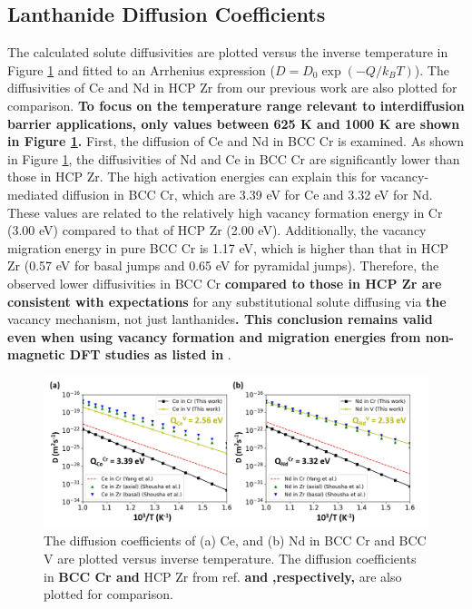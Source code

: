\documentclass[preprint,12pt]{elsarticle}
\providecommand{\DIFaddtex}[1]{{\bf #1}} %
\providecommand{\DIFdeltex}[1]{} %
\providecommand{\DIFaddbegin}{\protect\color{blue}} %
\providecommand{\DIFaddend}{\protect\color{black}} %
\providecommand{\DIFdelbegin}{\protect\color{red}} %
\providecommand{\DIFdelend}{\protect\color{black}} %
\providecommand{\DIFaddFL}[1]{\DIFadd{#1}} %
\providecommand{\DIFaddbeginFL}{} %
\providecommand{\DIFaddendFL}{} %
\providecommand{\DIFdelbeginFL}{} %
\providecommand{\DIFdelendFL}{} %
\providecommand{\DIFadd}[1]{\texorpdfstring{\DIFaddtex{#1}}{#1}} %
\providecommand{\DIFdel}[1]{\texorpdfstring{\DIFdeltex{#1}}{}} %
\newcommand{\DIFscaledelfig}{0.5}
\newlength{\DIFdelgraphicswidth} %
\newlength{\DIFdelgraphicsheight} %
\newcommand{\DIFaddincludegraphics}[2][]{{\color{blue}\fbox{\DIFOincludegraphics[#1]{#2}}}} %
\newcommand{\DIFdelincludegraphics}[2][]{%
\sbox{\DIFdelgraphicsbox}{\DIFOincludegraphics[#1]{#2}}%
\settoboxwidth{\DIFdelgraphicswidth}{\DIFdelgraphicsbox} %
\settoboxtotalheight{\DIFdelgraphicsheight}{\DIFdelgraphicsbox} %
\scalebox{\DIFscaledelfig}{%
\parbox[b]{\DIFdelgraphicswidth}{\usebox{\DIFdelgraphicsbox}\\[-\baselineskip] \rule{\DIFdelgraphicswidth}{0em}}\llap{\resizebox{\DIFdelgraphicswidth}{\DIFdelgraphicsheight}{%
\setlength{\unitlength}{\DIFdelgraphicswidth}%
\begin{picture}(1,1)%
\thicklines\linethickness{2pt} %
{\color[rgb]{1,0,0}\put(0,0){\framebox(1,1){}}}%
{\color[rgb]{1,0,0}\put(0,0){\line( 1,1){1}}}%
{\color[rgb]{1,0,0}\put(0,1){\line(1,-1){1}}}%
\end{picture}%
}\hspace*{3pt}}} %
} %
\DeclareRobustCommand{\DIFaddbegin}{\DIFOaddbegin \let\includegraphics\DIFaddincludegraphics} %
\DeclareRobustCommand{\DIFaddend}{\DIFOaddend \let\includegraphics\DIFOincludegraphics} %
\DeclareRobustCommand{\DIFdelbegin}{\DIFOdelbegin \let\includegraphics\DIFdelincludegraphics} %
\DeclareRobustCommand{\DIFdelend}{\DIFOaddend \let\includegraphics\DIFOincludegraphics} %
\DeclareRobustCommand{\DIFaddbeginFL}{\DIFOaddbeginFL \let\includegraphics\DIFaddincludegraphics} %
\DeclareRobustCommand{\DIFaddendFL}{\DIFOaddendFL \let\includegraphics\DIFOincludegraphics} %
\DeclareRobustCommand{\DIFdelbeginFL}{\DIFOdelbeginFL \let\includegraphics\DIFdelincludegraphics} %
\DeclareRobustCommand{\DIFdelendFL}{\DIFOaddendFL \let\includegraphics\DIFOincludegraphics} %
\begin{document}
\FloatBarrier
\subsection{Lanthanide Diffusion Coefficients}
The calculated solute diffusivities are plotted versus the inverse temperature in Figure \ref{fig:diff_cr_v} and fitted to an Arrhenius expression ($D = D_0 \exp(-Q/k_BT)$). The diffusivities of Ce and Nd in HCP Zr from our previous work \cite{shousha2024first} are also plotted for comparison. \DIFaddbegin \DIFadd{To focus on the temperature range relevant to interdiffusion barrier applications, only values between 625 K and 1000 K are shown in Figure \ref{fig:diff_cr_v}.
}\DIFaddend First, the diffusion of Ce and Nd in BCC Cr is examined. As shown in Figure \ref{fig:diff_cr_v}, the diffusivities of Nd and Ce in BCC Cr are significantly lower than those in HCP Zr. The high activation energies can explain this for vacancy-mediated diffusion in BCC Cr, which are 3.39 eV for Ce and 3.32 eV for Nd. These values are related to the relatively high vacancy formation energy in Cr (3.00 eV) compared to that of HCP Zr (2.00 eV). Additionally, the vacancy migration energy in pure BCC Cr is 1.17 eV, which is higher than that in HCP Zr (0.57 eV for basal jumps and 0.65 eV for pyramidal jumps). Therefore, the observed lower diffusivities in BCC Cr \DIFdelbegin \DIFdel{are expected }\DIFdelend \DIFaddbegin \DIFadd{compared to those in HCP Zr are consistent with expectations }\DIFaddend for any substitutional solute diffusing via \DIFdelbegin \DIFdel{a }\DIFdelend \DIFaddbegin \DIFadd{the }\DIFaddend vacancy mechanism, not just lanthanides\DIFdelbegin \DIFdel{like Ce and Nd}\DIFdelend \DIFaddbegin \DIFadd{. This conclusion remains valid even when using vacancy formation and migration energies from non-magnetic DFT studies \cite{nguyen_bcc_2006, yang_significant_2023, SHANG2016128} as listed in \Cref{tab:bulk_prop_cr_v}}\DIFaddend .

\begin{figure}[h!]
    \centering
    \DIFdelbeginFL %
\DIFdelendFL \DIFaddbeginFL \includegraphics[width=0.9\linewidth]{diffusivities_cr_v_yang.jpg}
    \DIFaddendFL \caption{The diffusion coefficients of (a) Ce, and (b) Nd in BCC Cr and BCC V are plotted versus inverse temperature. The diffusion coefficients in \DIFaddbeginFL \DIFaddFL{BCC Cr and }\DIFaddendFL HCP Zr from ref. \DIFaddbeginFL \DIFaddFL{\citep{yang_significant_2023} and }\DIFaddendFL \cite{shousha2024first}\DIFaddbeginFL \DIFaddFL{,respectively, }\DIFaddendFL are also plotted for comparison.}
    \label{fig:diff_cr_v}
\end{figure}
\end{document}
